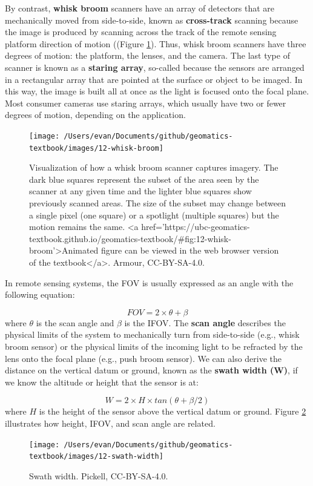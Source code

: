 \documentclass[
]{book}
\begin{document}
By contrast, \textbf{whisk broom} scanners have an array of detectors that are mechanically moved from side-to-side, known as \textbf{cross-track} scanning because the image is produced by scanning across the track of the remote sensing platform direction of motion ((Figure \ref{fig:12-whisk-broom}). Thus, whisk broom scanners have three degrees of motion: the platform, the lenses, and the camera. The last type of scanner is known as a \textbf{staring array}, so-called because the sensors are arranged in a rectangular array that are pointed at the surface or object to be imaged. In this way, the image is built all at once as the light is focused onto the focal plane. Most consumer cameras use staring arrays, which usually have two or fewer degrees of motion, depending on the application.

\begin{figure}
\texttt{[image: /Users/evan/Documents/github/geomatics-textbook/images/12-whisk-broom]} \caption{Visualization of how a whisk broom scanner captures imagery. The dark blue squares represent the subset of the area seen by the scanner at any given time and the lighter blue squares show previously scanned areas. The size of the subset may change between a single pixel (one square) or a spotlight (multiple squares) but the motion remains the same. <a href='https://ubc-geomatics-textbook.github.io/geomatics-textbook/#fig:12-whisk-broom'>Animated figure can be viewed in the web browser version of the textbook</a>. Armour, CC-BY-SA-4.0.}\label{fig:12-whisk-broom}
\end{figure}

In remote sensing systems, the FOV is usually expressed as an angle with the following equation:

\[
FOV = 2 × θ + β
\]
where \(θ\) is the scan angle and \(β\) is the IFOV. The \textbf{scan angle} describes the physical limits of the system to mechanically turn from side-to-side (e.g., whisk broom sensor) or the physical limits of the incoming light to be refracted by the lens onto the focal plane (e.g., push broom sensor). We can also derive the distance on the vertical datum or ground, known as the \textbf{swath width (W)}, if we know the altitude or height that the sensor is at:

\[
W = 2 × H × tan(θ + β/2) 
\]
where \(H\) is the height of the sensor above the vertical datum or ground. Figure \ref{fig:12-swath-width} illustrates how height, IFOV, and scan angle are related.

\begin{figure}
\texttt{[image: /Users/evan/Documents/github/geomatics-textbook/images/12-swath-width]} \caption{Swath width. Pickell, CC-BY-SA-4.0.}\label{fig:12-swath-width}
\end{figure}
\end{document}
